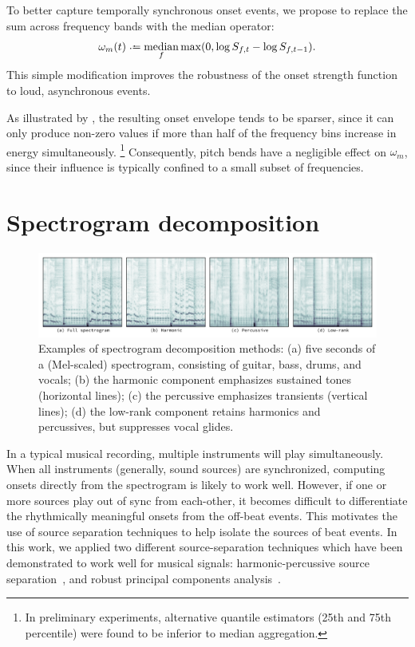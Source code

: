 \documentclass{article}
\begin{document}
To better capture temporally synchronous onset events, we propose to replace the sum
across frequency bands with the median operator:
\begin{equation}
\omega_m(t) \defeq \median_f \max(0, \log S_{f, t} - \log S_{f, t-1}).\label{eq:onset:median}
\end{equation}
This simple modification improves the robustness of the onset strength function to loud, 
asynchronous events.

As illustrated by , the resulting onset envelope tends to be sparser, 
since it can only produce non-zero values if more than half of the frequency bins 
increase in energy simultaneously.  
\footnote{In preliminary experiments, alternative quantile estimators 
(25th and 75th percentile) were found to be inferior to median aggregation.}
Consequently, pitch bends have a negligible effect on $\omega_m$, since their influence 
is typically confined to a small subset of frequencies.  

\section{Spectrogram decomposition}
\label{sec:spectrogram}

\begin{figure}
\centering%
\includegraphics[width=\textwidth]{figs/specgrams}%
\vspace{-\baselineskip}%
\caption{Examples of spectrogram decomposition methods: 
(a) five seconds of a (Mel-scaled) spectrogram, consisting of guitar, bass, drums, and vocals; 
(b) the harmonic component emphasizes sustained tones (horizontal lines); 
(c) the percussive emphasizes transients (vertical lines); 
(d) the low-rank component retains harmonics and percussives, but suppresses vocal glides.}
\label{fig:specgrams}
\end{figure}

In a typical musical recording, multiple instruments will play simultaneously. When
all instruments (generally, sound sources) are synchronized, computing onsets
directly from the spectrogram is likely to work well.  
However, if one or more sources play out of sync from each-other, it becomes difficult
to differentiate the rhythmically meaningful onsets from the off-beat events.  This
motivates the use of source separation techniques to help isolate the sources of beat
events.  In this work, we applied two different source-separation techniques which have
been demonstrated to work well for musical signals: harmonic-percussive source 
separation~\cite{ono2008real}, and robust principal components analysis~\cite{candes2011robust}.
\end{document}
